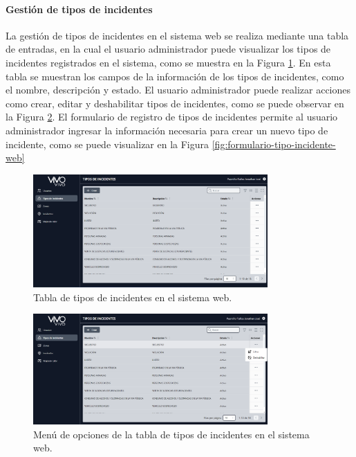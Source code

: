 \paragraph{Gestión de tipos de incidentes}
La gestión de tipos de incidentes en el sistema web se realiza mediante una tabla de entradas, en la cual el usuario administrador
puede visualizar los tipos de incidentes registrados en el sistema, como se muestra en la Figura \ref{fig:tabla-tipos-incidentes-web}.
En esta tabla se muestran los campos de la información de los tipos de incidentes, como el nombre, descripción y estado. El usuario
administrador puede realizar acciones como crear, editar y deshabilitar tipos de incidentes, como se puede observar en la Figura
\ref{fig:menu-tabla-tipos-incidentes-web}. El formulario de registro de tipos de incidentes permite al usuario administrador ingresar
la información necesaria para crear un nuevo tipo de incidente, como se puede visualizar en la Figura \ref{fig:formulario-tipo-incidente-web}

\begin{figure}[H]
    \centering
    \includegraphics[width=0.8\textwidth]{chapters/III-resultados-y-discusion/resources/images/tabla-tipos-incidentes-web.png}
    \caption{Tabla de tipos de incidentes en el sistema web.}
    \label{fig:tabla-tipos-incidentes-web}
\end{figure}

\begin{figure}[H]
    \centering
    \includegraphics[width=0.8\textwidth]{chapters/III-resultados-y-discusion/resources/images/menu-tabla-tipos-incidentes-web.png}
    \caption{Menú de opciones de la tabla de tipos de incidentes en el sistema web.}
    \label{fig:menu-tabla-tipos-incidentes-web}
\end{figure}

